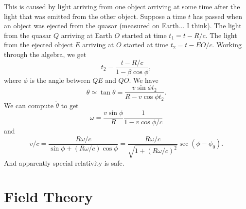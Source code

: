 \documentclass{article}
\numberwithin{equation}{section}
\begin{document}
This is caused by light arriving from one object arriving at some time after the light that was emitted from the other object. Suppose a time $t$ has passed when an object was ejected from the quasar (measured on Earth... I think). The light from the quasar $Q$ arriving at Earth $O$ started at time $t_1 = t - R/c.$ The light from the ejected object $E$ arriving at $O$ started at time $t_2 = t-EO/c.$ Working through the algebra, we get 
\begin{equation}
    t_2 = \frac{t-R/c}{1-\beta \cos\phi},
\end{equation}
where $\phi$ is the angle between $QE$ and $QO.$ We have 
\begin{equation}
    \theta \simeq \tan\theta = \frac{v\sin\phi t_2}{R-v\cos\phi t_2}.
\end{equation}
We can compute $\dot{\theta}$ to get 
\begin{equation}
    \omega = \frac{v\sin\phi}{R} \frac{1}{1-v\cos\phi/c}
\end{equation}
and 
\begin{equation}
    v/c = \frac{R\omega/ c}{\sin\phi + (R\omega /c)\cos\phi} = \frac{R\omega /c}{\sqrt{1+(R\omega /c)^2}}\sec(\phi-\phi_0).
\end{equation}
And apparently special relativity is safe.
\section{Field Theory}
\end{document}
